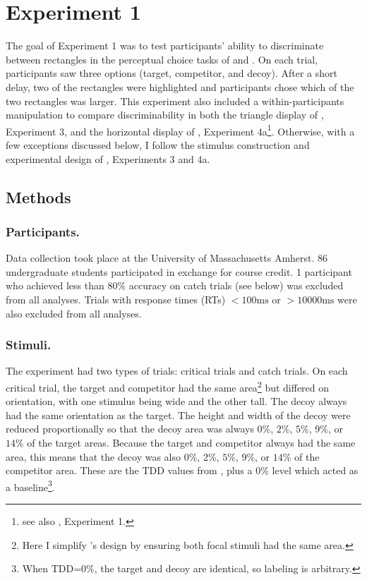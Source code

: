 \section{Experiment 1}

The goal of Experiment 1 was to test participants' ability to discriminate between rectangles in the perceptual choice tasks of \textcite{trueblood2013not} and \textcite{spektorWhenGoodLooks2018b}. 
On each trial, participants saw three options (target, competitor, and decoy). After a short delay, two of the rectangles were highlighted and participants chose which of the two rectangles was larger. 
This experiment also included a within-participants manipulation to compare discriminability in both the triangle display of \textcite{spektorWhenGoodLooks2018b}, Experiment 3, and the horizontal display of \textcite{spektorWhenGoodLooks2018b}, Experiment 4a\footnote{see also \textcite{trueblood2013not}, Experiment 1.}. Otherwise, with a few exceptions discussed below, I follow the stimulus construction and experimental design of \textcite{spektorWhenGoodLooks2018b}, Experiments 3 and 4a. 

\subsection{Methods}

\subsubsection{Participants.}
Data collection took place at the University of Massachusetts Amherst. 86 undergraduate students participated in exchange for course credit. 1 participant who achieved less than $80\%$ accuracy on catch trials (see below) was excluded from all analyses. Trials with response times (RTs) $<100\text{ms}$ or  $>10000\text{ms}$ were also excluded from all analyses.

\subsubsection{Stimuli.}
The experiment had two types of trials: critical trials and catch trials. 
On each critical trial, the target and competitor had the same area\footnote{Here I simplify \textcite{spektorWhenGoodLooks2018b}'s design by ensuring both focal stimuli had the same area.} but differed on orientation, with one stimulus being wide and the other tall. The decoy always had the same orientation as the target. The height and width of the decoy were reduced proportionally so that the decoy area was always $0\%$, $2\%$, $5\%$, $9\%$, or $14\%$ of the target areas. Because the target and competitor always had the same area, this means that the decoy was also $0\%$, $2\%$, $5\%$, $9\%$, or $14\%$ of the competitor area. These are the TDD values from \textcite{spektorWhenGoodLooks2018b}, plus a $0\%$ level which acted as a baseline\footnote{When TDD=$0\%$, the target and decoy are identical, so labeling is arbitrary.}.

